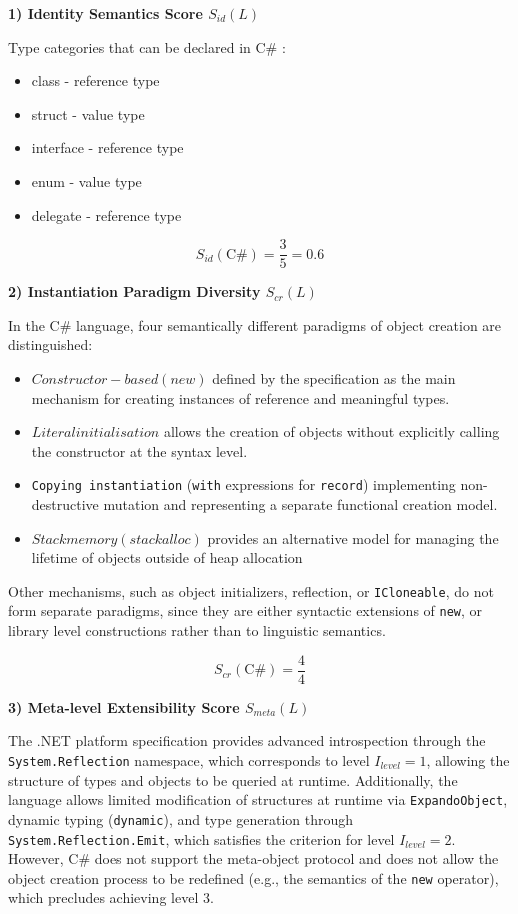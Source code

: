 \textbf{1) Identity Semantics Score $S_{id}(L)$}

Type categories that can be declared in C\# \cite{ecma334}:
\begin{itemize}
    \item class - reference type
    \item struct - value type
    \item interface - reference type
    \item enum - value type
    \item delegate - reference type
\end{itemize}

\[
    S_{id}(\text{C\#}) = \frac{3}{5} = 0.6
\]

\textbf{2) Instantiation Paradigm Diversity $S_{cr}(L)$}

In the C\# language, four semantically different paradigms of object creation are distinguished:

\begin{itemize}
    \item $Constructor-based (new)$ defined by the specification as the main mechanism for creating instances of reference and meaningful types.
    \item $Literal initialisation$  allows the creation of objects without explicitly calling the constructor at the syntax level.
    \item \texttt{Copying instantiation} (\texttt{with} expressions for \texttt{record}) implementing non-destructive mutation and representing a separate functional creation model.
    \item $Stack memory (stackalloc)$ provides an alternative model for managing the lifetime of objects outside of heap allocation
\end{itemize}

Other mechanisms, such as object initializers, reflection, or \texttt{ICloneable}, do not form separate paradigms, since they are either syntactic extensions of \texttt{new}, or library level constructions rather than to linguistic semantics.

\[
    S_{cr}(\text{C\#}) = \frac{4}{4}
\]


\textbf{3) Meta-level Extensibility Score $S_{meta}(L)$}

The .NET platform specification provides advanced introspection through the \texttt{System.Reflection} namespace, which corresponds to level $I_{level}=1$, allowing the structure of types and objects to be queried at runtime. 
Additionally, the language allows limited modification of structures at runtime via \texttt{ExpandoObject}, dynamic typing (\texttt{dynamic}), and type generation through \texttt{System.Reflection.Emit}, which satisfies the criterion for level $I_{level}=2$. 
However, C\# does not support the meta-object protocol and does not allow the object creation process to be redefined (e.g., the semantics of the \texttt{new} operator), which precludes achieving level $3$. 

